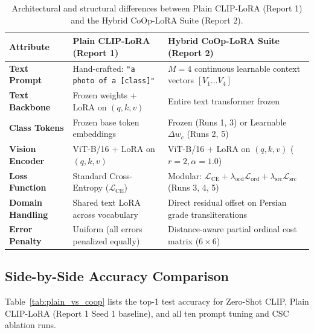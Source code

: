 \documentclass[letterpaper,11pt,leqno]{article}
\begin{document}
\begin{table}[H]
\centering
\caption{Architectural and structural differences between Plain CLIP-LoRA (Report 1)
and the Hybrid CoOp-LoRA Suite (Report 2).}
\small
\begin{tabular}{lp{5.8cm}p{7.2cm}}
\toprule
\textbf{Attribute} & \textbf{Plain CLIP-LoRA (Report 1)} & \textbf{Hybrid CoOp-LoRA Suite (Report 2)} \\
\midrule
\textbf{Text Prompt} & Hand-crafted: \texttt{"a photo of a [class]"} & $M=4$ continuous learnable context vectors $[V_1 \dots V_4]$ \\
\textbf{Text Backbone} & Frozen weights + LoRA on $(q, k, v)$ & Entire text transformer frozen \\
\textbf{Class Tokens} & Frozen base token embeddings & Frozen (Runs 1, 3) or Learnable $\Delta w_c$ (Runs 2, 5) \\
\textbf{Vision Encoder} & ViT-B/16 + LoRA on $(q, k, v)$ & ViT-B/16 + LoRA on $(q, k, v)$ ($r=2, \alpha=1.0$) \\
\textbf{Loss Function} & Standard Cross-Entropy ($\mathcal{L}_\mathrm{CE}$) & Modular: $\mathcal{L}_\mathrm{CE} + \lambda_\mathrm{ord}\mathcal{L}_\mathrm{ord} + \lambda_\mathrm{src}\mathcal{L}_\mathrm{src}$ (Runs 3, 4, 5) \\
\textbf{Domain Handling} & Shared text LoRA across vocabulary & Direct residual offset on Persian grade transliterations \\
\textbf{Error Penalty} & Uniform (all errors penalized equally) & Distance-aware partial ordinal cost matrix ($6 \times 6$) \\
\bottomrule
\end{tabular}
\label{tab:paradigm_comparison}
\end{table}

\subsection{Side-by-Side Accuracy Comparison}

Table~\ref{tab:plain_vs_coop} lists the top-1 test accuracy for Zero-Shot CLIP, Plain
CLIP-LoRA (Report 1 Seed 1 baseline), and all ten prompt tuning and CSC ablation runs.
\end{document}
